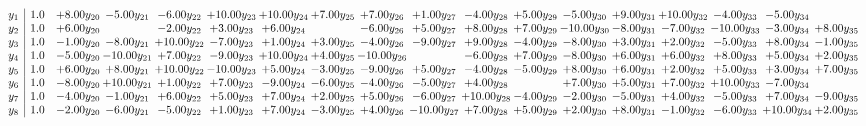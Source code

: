 \documentclass[9pt]{article}
\begin{document}
\[\begin{array}{c| c c@{\hskip 2pt} c@{\hskip 2pt} c@{\hskip 2pt} c@{\hskip 2pt} c@{\hskip 2pt} c@{\hskip 2pt} c@{\hskip 2pt} c@{\hskip 2pt} c@{\hskip 2pt} c@{\hskip 2pt} c@{\hskip 2pt} c@{\hskip 2pt} c@{\hskip 2pt} c@{\hskip 2pt} c@{\hskip 2pt} c@{\hskip 2pt} }
 y_{1}   &  1.0 & +  8.00 y_{20} & -5.00 y_{21} & -6.00 y_{22} & + 10.00 y_{23} & + 10.00 y_{24} & +  7.00 y_{25} & +  7.00 y_{26} & +  1.00 y_{27} & -4.00 y_{28} & +  5.00 y_{29} & -5.00 y_{30} & +  9.00 y_{31} & + 10.00 y_{32} & -4.00 y_{33} & -5.00 y_{34} &   \\
 y_{2}   &  1.0 & +  6.00 y_{20} &   & -2.00 y_{22} & +  3.00 y_{23} & +  6.00 y_{24} &   & -6.00 y_{26} & +  5.00 y_{27} & +  8.00 y_{28} & +  7.00 y_{29} & -10.00 y_{30} & -8.00 y_{31} & -7.00 y_{32} & -10.00 y_{33} & -3.00 y_{34} & +  8.00 y_{35}\\
 y_{3}   &  1.0 & -1.00 y_{20} & -8.00 y_{21} & + 10.00 y_{22} & -7.00 y_{23} & +  1.00 y_{24} & +  3.00 y_{25} & -4.00 y_{26} & -9.00 y_{27} & +  9.00 y_{28} & -4.00 y_{29} & -8.00 y_{30} & +  3.00 y_{31} & +  2.00 y_{32} & -5.00 y_{33} & +  8.00 y_{34} & -1.00 y_{35}\\
 y_{4}   &  1.0 & -5.00 y_{20} & -10.00 y_{21} & +  7.00 y_{22} & -9.00 y_{23} & + 10.00 y_{24} & +  4.00 y_{25} & -10.00 y_{26} &   & -6.00 y_{28} & +  7.00 y_{29} & -8.00 y_{30} & +  6.00 y_{31} & +  6.00 y_{32} & +  8.00 y_{33} & +  5.00 y_{34} & +  2.00 y_{35}\\
 y_{5}   &  1.0 & +  6.00 y_{20} & +  8.00 y_{21} & + 10.00 y_{22} & -10.00 y_{23} & +  5.00 y_{24} & -3.00 y_{25} & -9.00 y_{26} & +  5.00 y_{27} & -4.00 y_{28} & -5.00 y_{29} & +  8.00 y_{30} & +  6.00 y_{31} & +  2.00 y_{32} & +  5.00 y_{33} & +  3.00 y_{34} & +  7.00 y_{35}\\
 y_{6}   &  1.0 & -8.00 y_{20} & + 10.00 y_{21} & +  1.00 y_{22} & +  7.00 y_{23} & -9.00 y_{24} & -6.00 y_{25} & -4.00 y_{26} & -5.00 y_{27} & +  4.00 y_{28} &   & +  7.00 y_{30} & +  5.00 y_{31} & +  7.00 y_{32} & + 10.00 y_{33} & -7.00 y_{34} &   \\
 y_{7}   &  1.0 & -4.00 y_{20} & -1.00 y_{21} & +  6.00 y_{22} & +  5.00 y_{23} & +  7.00 y_{24} & +  2.00 y_{25} & +  5.00 y_{26} & -6.00 y_{27} & + 10.00 y_{28} & -4.00 y_{29} & -2.00 y_{30} & -5.00 y_{31} & +  4.00 y_{32} & -5.00 y_{33} & +  7.00 y_{34} & -9.00 y_{35}\\
 y_{8}   &  1.0 & -2.00 y_{20} & -6.00 y_{21} & -5.00 y_{22} & +  1.00 y_{23} & +  7.00 y_{24} & -3.00 y_{25} & +  4.00 y_{26} & -10.00 y_{27} & +  7.00 y_{28} & +  5.00 y_{29} & +  2.00 y_{30} & +  8.00 y_{31} & -1.00 y_{32} & -6.00 y_{33} & + 10.00 y_{34} & +  2.00 y_{35}\\

\end{array}\]
\end{document}
